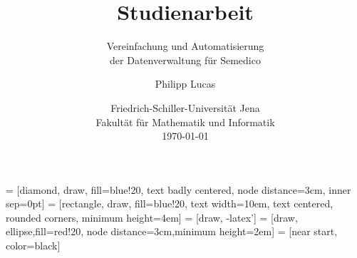\documentclass[paper=a4,fontsize=12pt,ngerman,bibliography=totoc,parskip=half]{scrartcl}
\title{Studienarbeit}
\subtitle{Vereinfachung und Automatisierung\\ der Datenverwaltung für Semedico}
\author{Philipp Lucas}
\date{Friedrich-Schiller-Universität Jena\\ Fakultät für Mathematik und Informatik \\
\today}%
\theoremstyle{break} %
\begin{document}
\usetikzlibrary{shapes,arrows}
\usetikzlibrary{positioning}
 	= [diamond, draw, fill=blue!20, text badly centered, node distance=3cm, inner sep=0pt]
 	= [rectangle, draw, fill=blue!20, text width=10em, text centered, rounded corners, minimum height=4em]
 	= [draw, -latex']
 	= [draw, ellipse,fill=red!20, node distance=3cm,minimum height=2em]
=  [near start, color=black]

\maketitle


\tableofcontents






\FloatBarrier


\FloatBarrier


\FloatBarrier


\FloatBarrier



\FloatBarrier


\FloatBarrier
\newpage


\newpage
\nocite{*} %
\printbibliography
\end{document}
